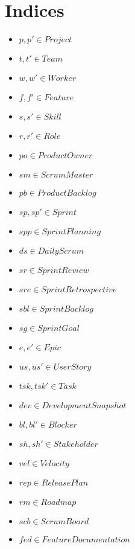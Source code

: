 \documentclass[11pt]{article}
\begin{document}
\section{Indices}
\begin{itemize}
    \item $p, p' \in Project$
    \item $t, t' \in Team$
    \item $w, w' \in Worker$
    \item $f, f' \in Feature$
    \item $s, s' \in Skill$
    \item $r, r' \in Role$
    \item $po \in ProductOwner$
    \item $sm \in ScrumMaster$
    \item $pb \in ProductBacklog$
    \item $sp, sp' \in Sprint$
    \item $spp \in SprintPlanning$
    \item $ds \in DailyScrum$
    \item $sr \in SprintReview$
    \item $sre \in SprintRetrospective$
    \item $sbl \in SprintBacklog$
    \item $sg \in SprintGoal$
    \item $e, e' \in Epic$
    \item $us, us' \in UserStory$
    \item $tsk, tsk' \in Task$
    \item $dev \in DevelopmentSnapshot$
    \item $bl, bl' \in Blocker$
    \item $sh, sh' \in Stakeholder$
    \item $vel \in Velocity$
    \item $rep \in ReleasePlan$
    \item $rm \in Roadmap$
    \item $scb \in ScrumBoard$
    \item $fed \in FeatureDocumentation$
\end{itemize}
\end{document}
